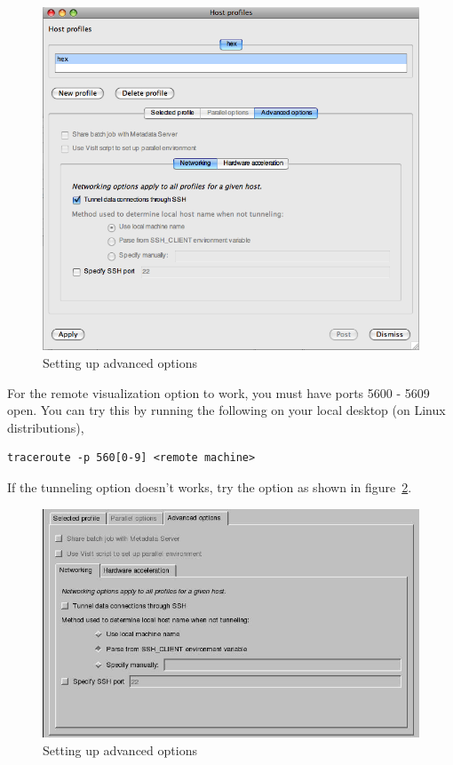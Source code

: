 \documentclass[12pt]{article}
\begin{document}
\begin{figure}

  \vspace{-30pt}
  \begin{center}
    \includegraphics[width=.5\textwidth]{VisItHostProfileAdv.png}
  \end{center}
  \vspace{-20pt}
  \caption{Setting up advanced options}
  \vspace{-10pt}
  \label{VisItHostProfileAdv}

\end{figure}

For the remote visualization option to work, you must have ports 5600
- 5609 open. You can try this by running the following on your local
desktop (on Linux distributions),

\begin{verbatim}
traceroute -p 560[0-9] <remote machine>
\end{verbatim}

If the tunneling option doesn't works, try the option as shown in
figure~\ref{VisItHostProfileAdv2}.


\begin{figure}

  \vspace{-30pt}
  \begin{center}
    \includegraphics[width=.5\textwidth]{VisItHostProfileAdv2.png}
  \end{center}
  \vspace{-20pt}
  \caption{Setting up advanced options}
  \vspace{-10pt}
  \label{VisItHostProfileAdv2}

\end{figure}
\end{document}
